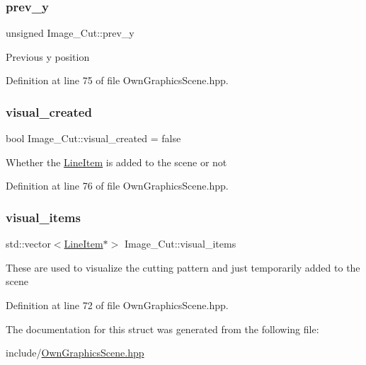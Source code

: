 \subsubsection{\texorpdfstring{prev\+\_\+y}{prev\_y}}
{\footnotesize\ttfamily unsigned Image\+\_\+\+Cut\+::prev\+\_\+y}

Previous y position 

Definition at line 75 of file Own\+Graphics\+Scene.\+hpp.

\mbox{\label{structImage__Cut_acbae7507f135d85e9f2f9724fbc2a643}} 
\subsubsection{\texorpdfstring{visual\+\_\+created}{visual\_created}}
{\footnotesize\ttfamily bool Image\+\_\+\+Cut\+::visual\+\_\+created = false}

Whether the \mbox{\hyperlink{classLineItem}{Line\+Item}} is added to the scene or not 

Definition at line 76 of file Own\+Graphics\+Scene.\+hpp.

\mbox{\label{structImage__Cut_ad56f1d72a3d7c5488fec27eaf5c6fbd9}} 
\subsubsection{\texorpdfstring{visual\+\_\+items}{visual\_items}}
{\footnotesize\ttfamily std\+::vector$<$\mbox{\hyperlink{classLineItem}{Line\+Item}}$\ast$$>$ Image\+\_\+\+Cut\+::visual\+\_\+items}

These are used to visualize the cutting pattern and just temporarily added to the scene 

Definition at line 72 of file Own\+Graphics\+Scene.\+hpp.



The documentation for this struct was generated from the following file\+:\begin{DoxyCompactItemize}
\item 
include/\mbox{\hyperlink{OwnGraphicsScene_8hpp}{Own\+Graphics\+Scene.\+hpp}}\end{DoxyCompactItemize}
